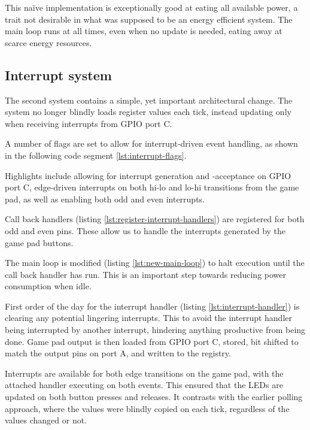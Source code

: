 This naïve implementation is exceptionally good at eating all available power, a trait not desirable in what was supposed to be an energy efficient system. The main loop runs at all times, even when no update is needed, eating away at scarce energy resources.


\subsection{Interrupt system}

The second system contains a simple, yet important architectural change. The system no longer blindly loads register values each tick, instead updating only when receiving interrupts from GPIO port C.

A number of flags are set to allow for interrupt-driven event handling, as shown in the following code segment \ref{lst:interrupt-flags}.

Highlights include allowing for interrupt generation and -acceptance on GPIO port C, edge-driven interrupts on both hi-lo and lo-hi transitions from the game pad, as well as enabling both odd and even interrupts.



Call back handlers (listing \ref{lst:register-interrupt-handlers}) are registered for both odd and even pins. These allow us to handle the interrupts generated by the game pad buttons.



The main loop is modified (listing \ref{lst:new-main-loop}) to halt execution until the call back handler has run. This is an important step towards reducing power consumption when idle.



First order of the day for the interrupt handler (listing \ref{lst:interrupt-handler}) is clearing any potential lingering interrupts. This to avoid the interrupt handler being interrupted by another interrupt, hindering anything productive from being done.
Game pad output is then loaded from GPIO port C, stored, bit shifted to match the output pins on port A, and written to the registry.

Interrupts are available for both edge transitions on the game pad, with the attached handler executing on both events.
This ensured that the LEDs are updated on both button presses and releases. It contrasts with the earlier polling approach, where the values were blindly copied on each tick, regardless of the values changed or not.

